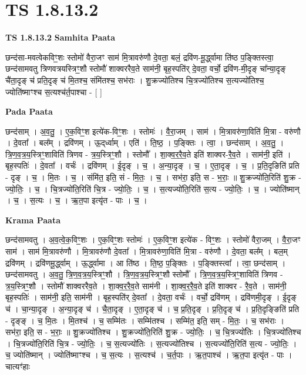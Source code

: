 \documentclass[17pt]{extarticle}
\begin{document}
\section{ TS 1.8.13.2 }

\textbf{TS 1.8.13.2 } \newline
\textbf{Samhita Paata} \newline

छन्द॑सा-मवत्वेकविꣳ॒॒शः स्तोमो॑ वैरा॒जꣳ साम॑ मि॒त्रावरु॑णौ दे॒वता॒ बलं॒ द्रवि॑ण-मू॒र्द्ध्वामा ति॑ष्ठ प॒ङ्क्तिस्त्वा॒ छन्द॑सामवतु त्रिणवत्रयस्त्रिꣳ॒॒शौ स्तोमौ॑ शाक्वररैव॒ते साम॑नी॒ बृह॒स्पति॑र् दे॒वता॒ वर्चो॒ द्रवि॑ण-मी॒दृङ् चा᳚न्या॒दृङ् चै॑ता॒दृङ् च॑ प्रति॒दृङ् च॑ मि॒तश्च॒ संमि॑तश्च॒ सभ॑राः । शु॒क्रज्यो॑तिश्च चि॒त्रज्यो॑तिश्च स॒त्यज्यो॑तिश्च॒ ज्योति॑ष्माꣳश्च स॒त्यश्च॑र्त॒पाश्चा - [ ] \newline

\textbf{Pada Paata} \newline

छन्द॑साम् । अ॒व॒तु॒ । ए॒क॒विꣳ॒॒श इत्ये॑क-विꣳ॒॒शः । स्तोमः॑ । वै॒रा॒जम् । साम॑ । मि॒त्रावरु॑णा॒विति॑ मि॒त्रा - वरु॑णौ । दे॒वता᳚ । बल᳚म् । द्रवि॑णम् । ऊ॒द्‌र्ध्वाम् । एति॑ । ति॒ष्ठ॒ । प॒ङ्क्तिः । त्वा॒ । छन्द॑साम् । अ॒व॒तु॒ । त्रि॒ण॒व॒त्र॒य॒स्त्रिꣳ॒॒शाविति॑ त्रिणव - त्र॒य॒स्त्रिꣳ॒॒शौ । स्तोमौ᳚ । शा॒क्व॒र॒रै॒व॒ते इति॑ शाक्वर-रै॒व॒ते । साम॑नी॒ इति॑ । बृह॒स्पतिः॑ । दे॒वता᳚ । वर्चः॑ । द्रवि॑णम् । ई॒दृङ् । च॒ । अ॒न्या॒दृङ् । च॒ । ए॒ता॒दृङ् । च॒ । प्र॒ति॒दृङिति॑ प्रति - दृङ् । च॒ । मि॒तः । च॒ । संमि॑त॒ इति॒ सं - मि॒तः॒ । च॒ । सभ॑रा॒ इति॒ स - भ॒राः॒ ॥ शु॒क्रज्यो॑ति॒रिति॑ शु॒क्र - ज्यो॒तिः॒ । च॒ । चि॒त्रज्यो॑ति॒रिति॑ चि॒त्र - ज्यो॒तिः॒ । च॒ । स॒त्यज्यो॑ति॒रिति॑ स॒त्य - ज्यो॒तिः॒ । च॒ । ज्योति॑ष्मान् । च॒ । स॒त्यः । च॒ । ऋ॒त॒पा इत्यृ॑त - पाः । च॒ ।  \newline


\textbf{Krama Paata} \newline

छन्द॑सामवतु । अ॒व॒त्वे॒क॒विꣳ॒॒शः । ए॒क॒विꣳ॒॒शः स्तोमः॑ । ए॒क॒विꣳ॒॒श इत्ये॑क - विꣳ॒॒शः । स्तोमो॑ वैरा॒जम् । वै॒रा॒जꣳ साम॑ । साम॑ मि॒त्रावरु॑णौ । मि॒त्रावरु॑णौ दे॒वता᳚ । मि॒त्रावरु॑णा॒विति॑ मि॒त्रा - वरु॑णौ । दे॒वता॒ बल᳚म् । बल॒म् द्रवि॑णम् । द्रवि॑णमू॒र्द्ध्वाम् । ऊ॒र्द्ध्वामा । आ ति॑ष्ठ । ति॒ष्ठ॒ प॒ङ्क्तिः । प॒ङ्क्तिस्त्वा᳚ । त्वा॒ छन्द॑साम् । छन्द॑सामवतु । अ॒व॒तु॒ त्रि॒ण॒व॒त्र॒य॒स्त्रिꣳ॒॒शौ । त्रि॒ण॒व॒त्र॒य॒स्त्रिꣳ॒॒शौ स्तोमौ᳚ । 
त्रि॒ण॒व॒त्र॒य॒स्त्रिꣳ॒॒शाविति॑ त्रिणव - त्र॒य॒स्त्रिꣳ॒॒शौ । स्तोमौ॑ शाक्वररैव॒ते । शा॒क्व॒र॒रै॒व॒ते साम॑नी । शा॒क्व॒र॒रै॒व॒ते इति॑ शाक्वर - रै॒व॒ते । साम॑नी॒ बृह॒स्पतिः॑ । साम॑नी॒ इति॒ साम॑नी । बृह॒स्पति॑र् दे॒वता᳚ । दे॒वता॒ वर्चः॑ । वर्चो॒ द्रवि॑णम् । द्रवि॑णमी॒दृङ् । ई॒दृङ् च॑ । चा॒न्या॒दृङ् । अ॒न्या॒दृङ् च॑ । चै॒ता॒दृङ् । ए॒ता॒दृङ् च॑ । च॒ प्र॒ति॒दृङ् । प्र॒ति॒दृङ् च॑ । प्र॒ति॒दृङ्ङिति॑ प्रति - दृङ्ङ् । च॒ मि॒तः । मि॒तश्च॑ । च॒ सम्मि॑तः । सम्मि॑तश्च । सम्मि॑त॒ इति॒ सम् - मि॒तः॒ । च॒ सभ॑राः । सभ॑रा॒ इति॒ स - भ॒राः॒ ॥ शु॒क्रज्यो॑तिश्च । शु॒क्रज्यो॑ति॒रिति॑ शु॒क्र - ज्यो॒तिः॒ । च॒ चि॒त्रज्यो॑तिः । चि॒त्रज्यो॑तिश्च । चि॒त्रज्यो॑ति॒रिति॑ चि॒त्र - ज्यो॒तिः॒ । च॒ स॒त्यज्यो॑तिः । स॒त्यज्यो॑तिश्च । स॒त्यज्यो॑ति॒रिति॑ स॒त्य - ज्यो॒तिः॒ । च॒ ज्योति॑ष्मान् । ज्योति॑ष्माꣳश्च । च॒ स॒त्यः । स॒त्यश्च॑ । च॒र्त॒पाः । ऋ॒त॒पाश्च॑ । ऋ॒त॒पा इत्यृ॑त - पाः । चात्यꣳ॑हाः \newline
\end{document}
